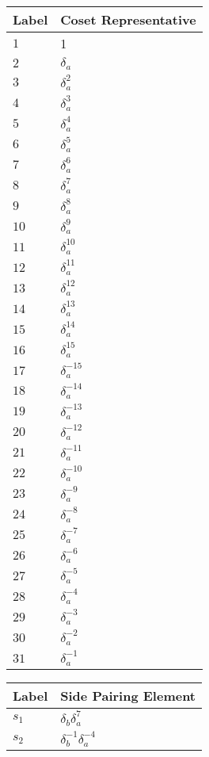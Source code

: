 \documentclass{article}
\begin{document}
\begin{center}
\begin{tabular}{ll}
\toprule
Label & Coset Representative\\
\midrule
$1$ & 1 \\
$2$ & $\delta_a^{}$ \\
$3$ & $\delta_a^{2}$ \\
$4$ & $\delta_a^{3}$ \\
$5$ & $\delta_a^{4}$ \\
$6$ & $\delta_a^{5}$ \\
$7$ & $\delta_a^{6}$ \\
$8$ & $\delta_a^{7}$ \\
$9$ & $\delta_a^{8}$ \\
$10$ & $\delta_a^{9}$ \\
$11$ & $\delta_a^{10}$ \\
$12$ & $\delta_a^{11}$ \\
$13$ & $\delta_a^{12}$ \\
$14$ & $\delta_a^{13}$ \\
$15$ & $\delta_a^{14}$ \\
$16$ & $\delta_a^{15}$ \\
$17$ & $\delta_a^{-15}$ \\
$18$ & $\delta_a^{-14}$ \\
$19$ & $\delta_a^{-13}$ \\
$20$ & $\delta_a^{-12}$ \\
$21$ & $\delta_a^{-11}$ \\
$22$ & $\delta_a^{-10}$ \\
$23$ & $\delta_a^{-9}$ \\
$24$ & $\delta_a^{-8}$ \\
$25$ & $\delta_a^{-7}$ \\
$26$ & $\delta_a^{-6}$ \\
$27$ & $\delta_a^{-5}$ \\
$28$ & $\delta_a^{-4}$ \\
$29$ & $\delta_a^{-3}$ \\
$30$ & $\delta_a^{-2}$ \\
$31$ & $\delta_a^{-1}$ \\
\bottomrule
\end{tabular}
\hfill
\begin{tabular}{ll}
\toprule
Label & Side Pairing Element\\
\midrule
$s_{1}$ & $\delta_b^{}\delta_a^{7}$ \\
$s_{2}$ & $\delta_b^{-1}\delta_a^{-4}$ \\

\end{tabular}
\end{center}
\end{document}
